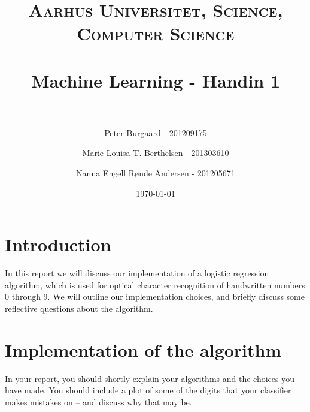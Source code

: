 \documentclass[paper=a4, fontsize=11pt]{scrartcl} %
\title{	
	\normalfont \normalsize 
	\textsc{Aarhus Universitet, Science, Computer Science} \\ [25pt] %
	\horrule{0.5pt} \\[0.4cm] %
	\huge Machine Learning - Handin 1 \\ %
	\horrule{2pt} \\[0.5cm] %
}
\author{Peter Burgaard - 201209175 \and Marie Louisa T. Berthelsen - 201303610 \and Nanna Engell Rønde Andersen - 201205671} %
\date{\normalsize\today} %
\numberwithin{equation}{section} %
\numberwithin{figure}{section} %
\numberwithin{table}{section} %
\begin{document}
\maketitle

\section*{Introduction}
In this report we will discuss our implementation of a logistic regression algorithm, which is used for optical character recognition of handwritten numbers 0 through 9. We will outline our implementation choices, and briefly discuss some reflective questions about the algorithm.

\section*{Implementation of the algorithm}

In your report, you should shortly explain your algorithms and the choices you have made. You should include a plot of some of the digits that your classifier makes mistakes on -- and discuss why that may be. \\ \\
\end{document}
